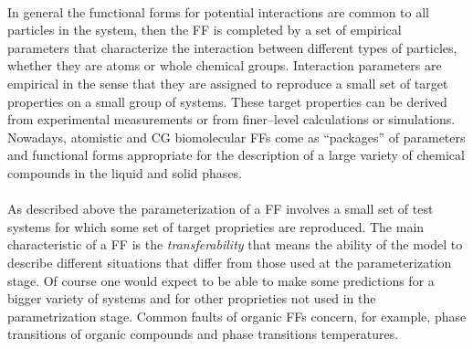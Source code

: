 \paragraph{\textbf{}} In general the functional forms for potential interactions are common to all particles in the system, then the \ac{FF} is completed by a set of empirical parameters that characterize the interaction between different types of particles, whether they are atoms or whole chemical groups.
Interaction parameters are empirical in the sense that they are assigned to reproduce a small set of target properties on a small group of systems. These target properties can be derived from experimental measurements or from finer--level calculations or simulations. Nowadays, atomistic and \ac{CG} biomolecular \acp{FF} come as ``packages'' of parameters and functional forms appropriate for the description of a large variety of chemical compounds in the liquid and solid phases.

\paragraph{\textbf{}} As described above the parameterization of a \ac{FF} involves a small set of test systems for which some set of target proprieties are reproduced. The main characteristic of a \ac{FF} is the \textit{transferability} that means the ability of the model to describe different situations that differ from those used at the parameterization stage. Of course one would expect to be able to make some predictions for a bigger variety of systems and for other proprieties not used in the parametrization stage. Common faults of organic \acp{FF} concern, for example, phase transitions of organic compounds and phase transitions temperatures.

